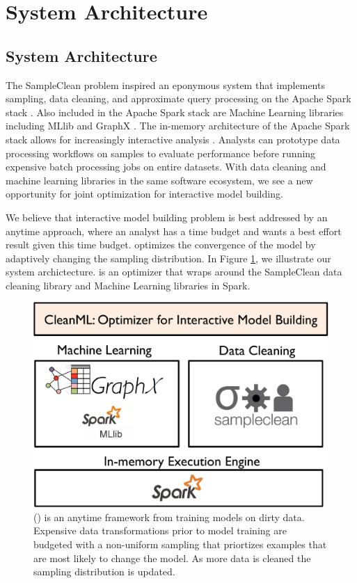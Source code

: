 \section{System Architecture}

\subsection{System Architecture}
The SampleClean problem inspired an eponymous system that implements sampling, data cleaning, and approximate query processing on the Apache Spark stack \cite{sampleclean}.
Also included in the Apache Spark stack are Machine Learning libraries including MLlib \cite{mllib} and GraphX \cite{graphx}.
The in-memory architecture of the Apache Spark stack allows for increasingly interactive analysis \cite{AgarwalMPMMS13, armbrust2015spark}.
Analysts can prototype data processing workflows on samples to evaluate performance before running expensive batch processing jobs on entire datasets.
With data cleaning and machine learning libraries in the same software ecosystem, we see a new opportunity for joint optimization for interactive model building.

We believe that interactive model building problem is best addressed by an anytime approach, where an analyst has a time budget and wants a best effort result given this time budget.
\sys optimizes the convergence of the model by adaptively changing the sampling distribution.
In Figure \ref{sys-arch}, we illustrate our system archictecture.
\sys is an optimizer that wraps around the SampleClean data cleaning library and Machine Learning libraries in Spark.

\begin{figure}[t]
\centering
 \includegraphics[width=0.8\columnwidth]{figs/arch.pdf}
 \caption{\sysfull (\sys) is an anytime framework from training models on dirty data. Expensive data transformations prior to model training are budgeted with a non-uniform sampling that priortizes examples that are most likely to change the model. As more data is cleaned the sampling distribution is updated.  \label{sys-arch}}
\end{figure}

